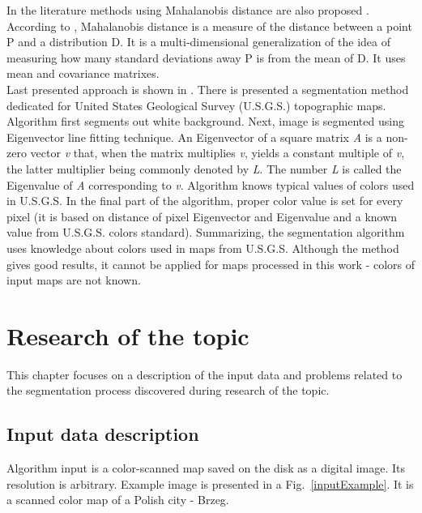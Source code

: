 \documentclass[a4paper,onecolumn,oneside,12pt]{memoir}
\begin{document}
In the literature methods using Mahalanobis distance are also proposed
\cite{mahalanobisConclusionsCite}. According to \cite{mahalanobisWiki}, Mahalanobis distance is a
measure of the distance between a point P and a distribution D. It is a multi-dimensional
generalization of the idea of measuring how many standard deviations away P is from the mean of D.
It uses mean and covariance matrixes. \\

Last presented approach is shown in \cite{colorMapSegmentation}. There is presented a segmentation
method dedicated for United States Geological Survey (U.S.G.S.) topographic maps. Algorithm first 
segments out white background. Next, image is segmented using Eigenvector line fitting technique.
An Eigenvector of a square matrix \textit{A} \cite{eigenWiki} is a non-zero vector \textit{v} that,
when the matrix multiplies \textit{v}, yields a constant multiple of \textit{v}, the latter
multiplier being commonly denoted by \textit{L}. The number \textit{L} is called the Eigenvalue of
\textit{A} corresponding to \textit{v}. Algorithm knows typical values of colors used in U.S.G.S. In
the final part of the algorithm, proper color value is set for every pixel (it is based on distance
of pixel Eigenvector and Eigenvalue and a known value from U.S.G.S. colors standard). Summarizing,
the segmentation algorithm uses knowledge about colors used in maps from U.S.G.S. Although the
method gives good results, it cannot be applied for maps processed in this work - colors of input
maps are not known.

\chapter{Research of the topic}

This chapter focuses on a description of the input data and problems related to the segmentation
process discovered during research of the topic.

\section{Input data description}

Algorithm input is a color-scanned map saved on the disk as a digital image. Its resolution is
arbitrary. Example image is presented in a Fig.~\ref{inputExample}. It is a scanned color map of a
Polish city - Brzeg.
\end{document}
